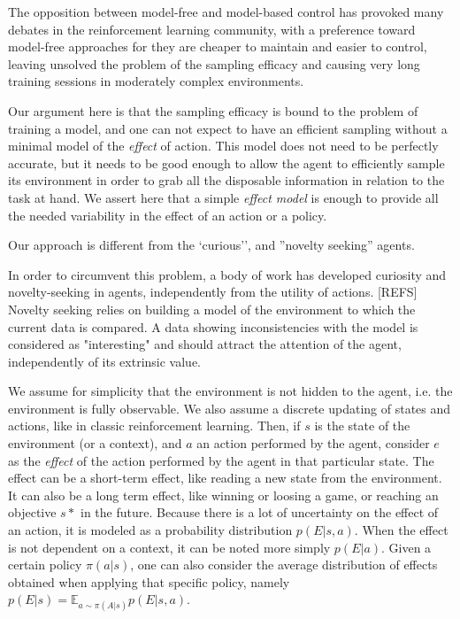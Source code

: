 \documentclass[runningheads]{llncs}
\begin{document}
The opposition between model-free and model-based control has provoked many debates in the reinforcement learning community, with a preference toward model-free approaches for they are cheaper to maintain and easier to control, leaving unsolved the problem of the sampling efficacy and causing very long training sessions in moderately complex environments.
 
Our argument here is that the sampling efficacy is bound to the problem of training a model, and one can not expect to have an efficient sampling without a minimal model of the \emph{effect} of action. This model does not need to be perfectly accurate, but it needs to be good enough to allow the agent to efficiently sample its environment in order to grab all the disposable information in relation to the task at hand. We assert here that a simple \emph{effect model} is enough to provide all the needed variability in the effect of an action or a policy. 

Our approach is different from the `curious'', and ''novelty seeking'' agents.

In order to circumvent this problem, a body of work has developed curiosity and novelty-seeking in agents, independently from the utility of actions.  [REFS]
Novelty seeking relies on building a model of the environment to which the current data is compared. A data showing inconsistencies with the model is considered as "interesting" and should attract the attention of the agent, independently of its extrinsic value.  

We assume for simplicity that the environment is not hidden to the agent, i.e. the environment is fully observable. We also assume a discrete updating of states and actions, like in classic reinforcement learning.
Then, if $s$ is the state of the environment (or a context), and $a$ an action performed by the agent, consider $e$ as the \emph{effect} of the action performed by the agent in that particular state. The effect can be a short-term effect, like reading a new state from the environment. It can also be a long term effect, like winning or loosing a game, or reaching an objective $s*$ in the future. Because there is a lot of uncertainty on the effect of an action, it is modeled as a probability distribution $p(E|s,a)$.
When the effect is not dependent on a context, it can be noted more simply $p(E|a)$.
Given a certain policy $\pi(a|s)$, one can also consider the average distribution of effects obtained when applying that specific policy, namely $p(E|s) = \mathbb{E}_{a\sim \pi(A|s)} p(E|s,a)$.  
\end{document}
